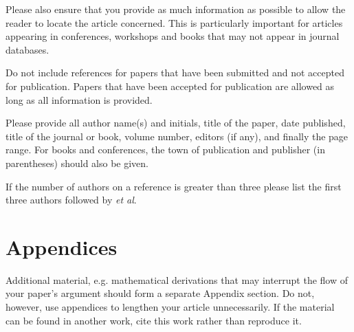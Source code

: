 \documentclass{ietperso}
\begin{document}
\begin{ietbody}
Please also ensure that you provide as much information as possible to allow the reader to locate the article concerned. This is particularly important for articles appearing in conferences, workshops and books that may not appear in journal databases.

Do not include references for papers that have been submitted and not accepted for publication. Papers that have been accepted for publication are allowed as long as all information is provided.

Please provide all author name(s) and initials, title of the paper, date published, title of the journal or book, volume number, editors (if any), and finally the page range. For books and conferences, the town of publication and publisher (in parentheses) should also be given.

If the number of authors on a reference is greater than three please list the first three authors followed by \textit{et al}. 

\section{Appendices}
Additional material, e.g. mathematical derivations that may interrupt the flow of your paper's argument should form a separate Appendix section. Do not, however, use appendices to lengthen your article unnecessarily. If the material can be found in another work, cite this work rather than reproduce it.

\nocite{smith_2007_the,brown_2012_the,jones_2006_the,hodges_2004_the,harrison_2005_the,iet_2013_report}
\nocite{brown_2004_the,smith_1925,abbott_2005_the,standard_2006}




\end{ietbody}
\end{document}
